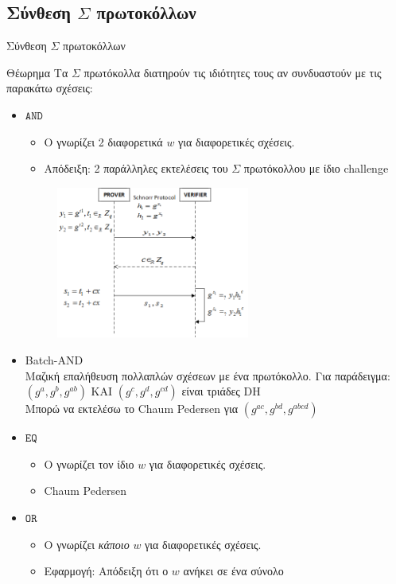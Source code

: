 \documentclass[handout]{beamer}
\begin{document}
\subsection{Σύνθεση $\Sigma$ πρωτοκόλλων}
\begin{frame}[allowframebreaks]{Σύνθεση $\Sigma$ πρωτοκόλλων}
\begin{block}{Θέωρημα} 
Τα $\Sigma$ πρωτόκολλα διατηρούν τις ιδιότητες τους αν συνδυαστούν με τις παρακάτω σχέσεις:
\end{block}
\begin{itemize}
\item $\mathtt{AND}$
\begin{itemize}
\item O \prv γνωρίζει 2 διαφορετικά $w$ για διαφορετικές σχέσεις.
\item Απόδειξη: 2 παράλληλες εκτελέσεις του  $\Sigma$ πρωτόκολλου με ίδιο challenge
\end{itemize}
\begin{figure}
\centering
\includegraphics[width=0.6\textwidth]{schnorrand.png}
\end{figure}
\framebreak
\item Batch-AND\\
Μαζική επαλήθευση πολλαπλών σχέσεων με ένα πρωτόκολλο.
Για παράδειγμα: \\ 
$(g^a, g^b, g^{ab})$ ΚΑΙ  $(g^c, g^d, g^{cd})$ είναι τριάδες DH\\
Μπορώ να εκτελέσω το Chaum Pedersen για $(g^{ac}, g^{bd}, g^{abcd})$
\item $\mathtt{EQ}$
\begin{itemize}
\item O \prv γνωρίζει τον ίδιο $w$ για διαφορετικές σχέσεις.
\item Chaum Pedersen
\end{itemize}
\item $\mathtt{OR}$
\begin{itemize}
\item O \prv γνωρίζει \emph{κάποιο} $w$ για διαφορετικές σχέσεις.
\item Εφαρμογή: Απόδειξη ότι ο $w$ ανήκει σε ένα σύνολο
\end{itemize}
\end{itemize} 
\end{frame}
\end{document}
